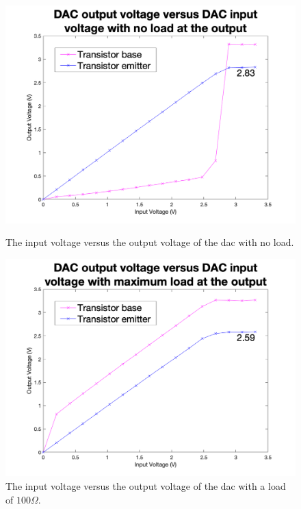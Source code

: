 \begin{figure}[!h]
    \centering
    \begin{minipage}{.5\textwidth}
        \centering
        \includegraphics[width=\textwidth]{Figures/Testing/DAC_no_load}
        \caption{The input voltage versus the output voltage of the \gls{dac} with no load.}
        \label{fig:dac-voltage-range-no-load} %
    \end{minipage}%
    \begin{minipage}{.5\textwidth}
        \centering
        \includegraphics[width=\textwidth]{Figures/Testing/DAC_loaded}
        \caption{The input voltage versus the output voltage of the \gls{dac} with a load of $100\Omega$.}
        \label{fig:dac-voltage-range-loaded} %
    \end{minipage}
\end{figure}

